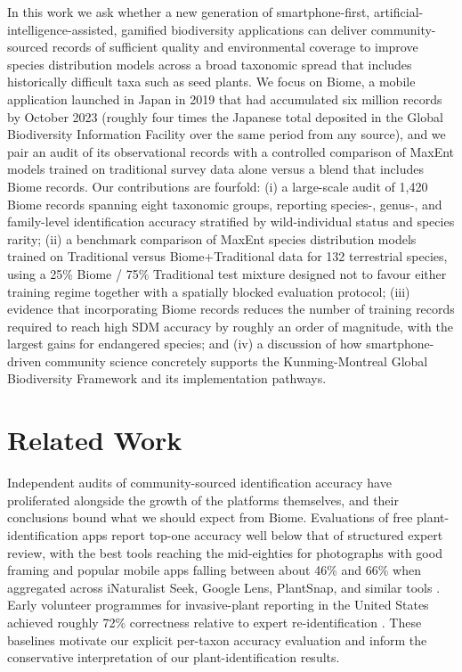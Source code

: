 \documentclass[11pt]{article}
\begin{document}
In this work we ask whether a new generation of smartphone-first, artificial-intelligence-assisted, gamified biodiversity applications can deliver community-sourced records of sufficient quality and environmental coverage to improve species distribution models across a broad taxonomic spread that includes historically difficult taxa such as seed plants. We focus on Biome, a mobile application launched in Japan in 2019 that had accumulated six million records by October 2023 (roughly four times the Japanese total deposited in the Global Biodiversity Information Facility over the same period from any source), and we pair an audit of its observational records with a controlled comparison of MaxEnt models trained on traditional survey data alone versus a blend that includes Biome records. Our contributions are fourfold: (i) a large-scale audit of 1{,}420 Biome records spanning eight taxonomic groups, reporting species-, genus-, and family-level identification accuracy stratified by wild-individual status and species rarity; (ii) a benchmark comparison of MaxEnt species distribution models trained on Traditional versus Biome+Traditional data for 132 terrestrial species, using a 25\% Biome / 75\% Traditional test mixture designed not to favour either training regime together with a spatially blocked evaluation protocol; (iii) evidence that incorporating Biome records reduces the number of training records required to reach high SDM accuracy by roughly an order of magnitude, with the largest gains for endangered species; and (iv) a discussion of how smartphone-driven community science concretely supports the Kunming-Montreal Global Biodiversity Framework and its implementation pathways.

\section{Related Work}

Independent audits of community-sourced identification accuracy have proliferated alongside the growth of the platforms themselves, and their conclusions bound what we should expect from Biome. Evaluations of free plant-identification apps report top-one accuracy well below that of structured expert review, with the best tools reaching the mid-eighties for photographs with good framing and popular mobile apps falling between about 46\% and 66\% when aggregated across iNaturalist Seek, Google Lens, PlantSnap, and similar tools \citep{hart2023plantapps}. Early volunteer programmes for invasive-plant reporting in the United States achieved roughly 72\% correctness relative to expert re-identification \citep{crall2011assessing}. These baselines motivate our explicit per-taxon accuracy evaluation and inform the conservative interpretation of our plant-identification results.
\end{document}
